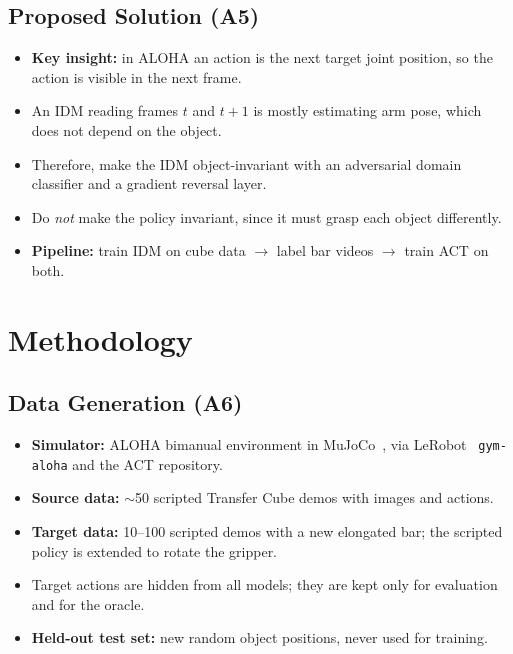 \documentclass[11pt]{article}
\begin{document}
\subsection{Proposed Solution (A5)}
\begin{itemize}
  \item \textbf{Key insight:} in ALOHA an action is the next target joint
    position, so the action is visible in the next frame.
  \item An IDM reading frames $t$ and $t+1$ is mostly estimating arm pose,
    which does not depend on the object.
  \item Therefore, make the IDM object-invariant with an adversarial domain
    classifier and a gradient reversal layer.
  \item Do \emph{not} make the policy invariant, since it must grasp each
    object differently.
  \item \textbf{Pipeline:} train IDM on cube data $\rightarrow$ label bar
    videos $\rightarrow$ train ACT on both.
\end{itemize}

\section{Methodology}

\subsection{Data Generation (A6)}
\begin{itemize}
  \item \textbf{Simulator:} ALOHA bimanual environment in
    MuJoCo~\cite{todorov2012mujoco}, via LeRobot~\cite{cadene2024lerobot}
    \texttt{gym-aloha} and the ACT repository.
  \item \textbf{Source data:} $\sim$50 scripted Transfer Cube demos with images
    and actions.
  \item \textbf{Target data:} 10--100 scripted demos with a new elongated bar;
    the scripted policy is extended to rotate the gripper.
  \item Target actions are hidden from all models; they are kept only for
    evaluation and for the oracle.
  \item \textbf{Held-out test set:} new random object positions, never used for
    training.
\end{itemize}
\end{document}
